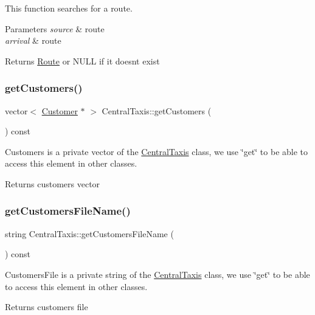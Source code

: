 This function searches for a route. 
\begin{DoxyParams}{Parameters}
{\em source} & route \\
\hline
{\em arrival} & route \\
\hline
\end{DoxyParams}
\begin{DoxyReturn}{Returns}
\hyperlink{classRoute}{Route} or N\+U\+LL if it doesn\textquotesingle{}t exist 
\end{DoxyReturn}
\hypertarget{classCentralTaxis_a906b443fab8b19ebadb141c83bb769c7}{}\label{classCentralTaxis_a906b443fab8b19ebadb141c83bb769c7} 
\subsubsection{\texorpdfstring{get\+Customers()}{getCustomers()}}
{\footnotesize\ttfamily vector$<$ \hyperlink{classCustomer}{Customer} $\ast$ $>$ Central\+Taxis\+::get\+Customers (\begin{DoxyParamCaption}{ }\end{DoxyParamCaption}) const}

Customers is a private vector of the \hyperlink{classCentralTaxis}{Central\+Taxis} class, we use \char`\"{}get\char`\"{} to be able to access this element in other classes. \begin{DoxyReturn}{Returns}
customers vector 
\end{DoxyReturn}
\hypertarget{classCentralTaxis_a64985fb9b31e49a68b9f70450ce59c88}{}\label{classCentralTaxis_a64985fb9b31e49a68b9f70450ce59c88} 
\subsubsection{\texorpdfstring{get\+Customers\+File\+Name()}{getCustomersFileName()}}
{\footnotesize\ttfamily string Central\+Taxis\+::get\+Customers\+File\+Name (\begin{DoxyParamCaption}{ }\end{DoxyParamCaption}) const}

Customers\+File is a private string of the \hyperlink{classCentralTaxis}{Central\+Taxis} class, we use \char`\"{}get\char`\"{} to be able to access this element in other classes. \begin{DoxyReturn}{Returns}
customers file 
\end{DoxyReturn}
\hypertarget{classCentralTaxis_a16d7310cd6a72a69855756902aec68ec}{}\label{classCentralTaxis_a16d7310cd6a72a69855756902aec68ec} 
